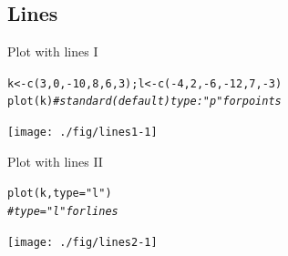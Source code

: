 \documentclass[xcolor=table,       handout,    xcolor=dvipsnames]{beamer}\usepackage[]{graphicx}\usepackage[]{color}
\makeatletter
\newcommand{\hlnum}[1]{\textcolor[rgb]{0,0,0}{#1}}
\newcommand{\hlstr}[1]{\textcolor[rgb]{0.545,0.137,0.137}{#1}}
\newcommand{\hlcom}[1]{\textcolor[rgb]{0,0.392,0}{\textit{#1}}}
\newcommand{\hlopt}[1]{\textcolor[rgb]{0,0,0}{#1}}
\newcommand{\hlstd}[1]{\textcolor[rgb]{0,0,0}{#1}}
\newcommand{\hlkwb}[1]{\textcolor[rgb]{0,0,0}{#1}}
\newcommand{\hlkwc}[1]{\textcolor[rgb]{1,0,1}{#1}}
\newcommand{\hlkwd}[1]{\textcolor[rgb]{0,0,1}{#1}}
\newenvironment{kframe}{%
 \def\at@end@of@kframe{}%
 \ifinner\ifhmode%
  \def\at@end@of@kframe{\end{minipage}}%
  \begin{minipage}{\columnwidth}%
 \fi\fi%
 \def\FrameCommand##1{\hskip\@totalleftmargin \hskip-\fboxsep
 \colorbox{shadecolor}{##1}\hskip-\fboxsep
     \hskip-\linewidth \hskip-\@totalleftmargin \hskip\columnwidth}%
 \MakeFramed {\advance\hsize-\width
   \@totalleftmargin\z@ \linewidth\hsize
   \@setminipage}}%
 {\par\unskip\endMakeFramed%
 \at@end@of@kframe}
\newenvironment{knitrout}{}{} %
\makeatother
\begin{document}
\subsection{Lines}

\begin{frame}[fragile]{Plot with lines I}
\begin{knitrout}
\color{fgcolor}\begin{kframe}
\begin{alltt}
\hlstd{k} \hlkwb{<-} \hlkwd{c}\hlstd{(}\hlnum{3}\hlstd{,}\hlnum{0}\hlstd{,}\hlopt{-}\hlnum{10}\hlstd{,}\hlnum{8}\hlstd{,}\hlnum{6}\hlstd{,}\hlnum{3}\hlstd{)   ; l} \hlkwb{<-} \hlkwd{c}\hlstd{(}\hlopt{-}\hlnum{4}\hlstd{,}\hlnum{2}\hlstd{,}\hlopt{-}\hlnum{6}\hlstd{,}\hlopt{-}\hlnum{12}\hlstd{,}\hlnum{7}\hlstd{,}\hlopt{-}\hlnum{3}\hlstd{)}
\hlkwd{plot}\hlstd{(k)}  \hlcom{# standard (default) type: "p" for points}
\end{alltt}
\end{kframe}

{\centering \texttt{[image: ./fig/lines1-1]} 

}



\end{knitrout}
\end{frame}


\begin{frame}[fragile]{Plot with lines II}
\begin{knitrout}
\color{fgcolor}\begin{kframe}
\begin{alltt}
\hlkwd{plot}\hlstd{(k,} \hlkwc{type}\hlstd{=}\hlstr{"l"}\hlstd{)}
\hlcom{# type="l" for lines}
\end{alltt}
\end{kframe}

{\centering \texttt{[image: ./fig/lines2-1]} 

}



\end{knitrout}
\end{frame}
\end{document}
